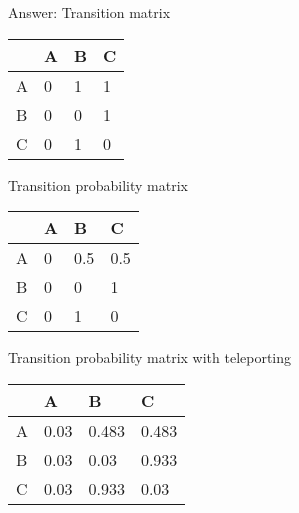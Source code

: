 \documentclass[11pt,a4paper]{report}
\begin{document}
\begin{multicols*}{2}
\begin{center}
\end{center}

\noindent Answer: Transition matrix
\begin{center}
\begin{tabular}{ |l|l|l|l| } 
    \hline
      & A  & B  & C \\
    \hline 
    A & 0  & 1  & 1  \\
    B & 0  & 0  & 1  \\
    C & 0  & 1  & 0  \\
    \hline
\end{tabular}
\end{center}

\noindent Transition probability matrix
\begin{center}
\begin{tabular}{ |l|l|l|l| } 
    \hline
      & A    & B  & C \\
    \hline 
    A & 0    & 0.5 & 0.5  \\
    B & 0    & 0   & 1    \\
    C & 0    & 1   & 0    \\
    \hline
\end{tabular}
\end{center}

\noindent Transition probability matrix with teleporting
\begin{center}
\begin{tabular}{ |l|l|l|l| } 
    \hline
      & A    & B    & C      \\
    \hline 
    A & 0.03  & 0.483 & 0.483  \\
    B & 0.03  & 0.03  & 0.933 \\
    C & 0.03  & 0.933 & 0.03  \\
    \hline
\end{tabular}
\end{center}


\end{multicols*}
\end{document}
